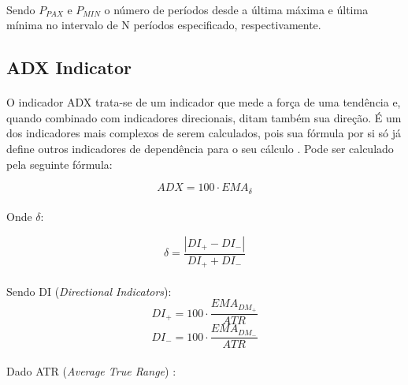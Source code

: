 \documentclass[grad,numbers]{coppe}
\begin{document}
            \paragraph{}Sendo $P_{PAX}$ e $P_{MIN}$ o número de períodos desde a última máxima e última mínima no intervalo de N períodos especificado, respectivamente.
            
        \subsection{ADX Indicator}
            \paragraph{}O indicador ADX trata-se de um indicador que mede a força de uma tendência e, quando combinado com indicadores direcionais, ditam também sua direção. É um dos indicadores mais complexos de serem calculados, pois sua fórmula por si só já define outros indicadores de dependência para o seu cálculo \cite{adx-indicator}. Pode ser calculado pela seguinte fórmula:
            
            \begin{equation}
                ADX = 100 \cdot EMA_{\delta}
            \end{equation}
            
            \paragraph{}Onde $\delta$:
            
            \begin{equation}
                \delta = \frac{|DI_{+} - DI_{-}|}{DI_{+} + DI_{-}}
            \end{equation}
            
            \paragraph{}Sendo DI (\textit{Directional Indicators}):
            \begin{equation}
                DI_{+} = 100 \cdot \frac{ EMA_{DM_{+}}}{ATR}
            \end{equation}
            \begin{equation}
                DI_{-} = 100 \cdot \frac{ EMA_{DM_{-}}}{ATR}
            \end{equation}
            
            \paragraph{}Dado ATR (\textit{Average True Range}) \cite{atr-indicator}:
            
\end{document}
